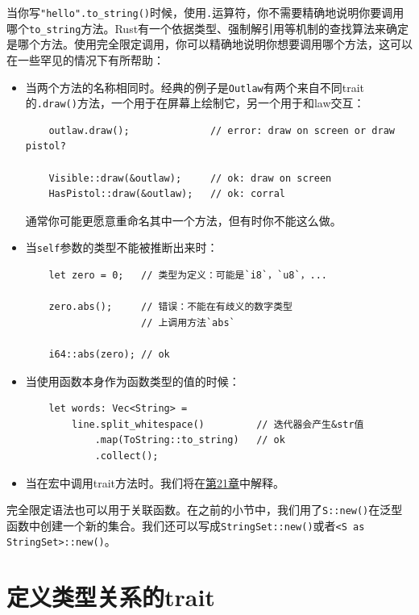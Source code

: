 当你写\texttt{"hello".to\_string()}时候，使用\texttt{.}运算符，你不需要精确地说明你要调用哪个\texttt{to\_string}方法。Rust有一个依据类型、强制解引用等机制的查找算法来确定是哪个方法。使用完全限定调用，你可以精确地说明你想要调用哪个方法，这可以在一些罕见的情况下有所帮助：
\begin{itemize}
    \item 当两个方法的名称相同时。经典的例子是\texttt{Outlaw}有两个来自不同trait的\texttt{.draw()}方法，一个用于在屏幕上绘制它，另一个用于和law交互：
    \begin{verbatim}
    outlaw.draw();              // error: draw on screen or draw pistol?

    Visible::draw(&outlaw);     // ok: draw on screen
    HasPistol::draw(&outlaw);   // ok: corral
    \end{verbatim}

    通常你可能更愿意重命名其中一个方法，但有时你不能这么做。

    \item 当\texttt{self}参数的类型不能被推断出来时：
    \begin{verbatim}
    let zero = 0;   // 类型为定义：可能是`i8`，`u8`，...

    zero.abs();     // 错误：不能在有歧义的数字类型
                    // 上调用方法`abs`

    i64::abs(zero); // ok
    \end{verbatim}

    \item 当使用函数本身作为函数类型的值的时候：
    \begin{verbatim}
    let words: Vec<String> =
        line.split_whitespace()         // 迭代器会产生&str值
            .map(ToString::to_string)   // ok
            .collect();
    \end{verbatim}

    \item 当在宏中调用trait方法时。我们将在\hyperref[ch21]{第21章}中解释。
\end{itemize}

完全限定语法也可以用于关联函数。在之前的小节中，我们用了\texttt{S::new()}在泛型函数中创建一个新的集合。我们还可以写成\texttt{StringSet::new()}或者\texttt{<S as StringSet>::new()}。

\section{定义类型关系的trait}

